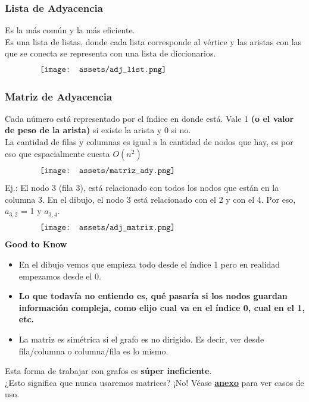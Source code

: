 \documentclass[10pt,a4paper]{article}
\begin{document}
\subsubsection*{Lista de Adyacencia}
Es la más común y la más eficiente. \\
Es una lista de listas, donde cada lista corresponde al vértice y las aristas con las que se conecta se representa con una lista de diccionarios. 
\[\begin{minipage}[b]{0.8\textwidth}
    \texttt{[image: assets/adj\_list.png]}
\end{minipage}\]
\subsubsection*{Matriz de Adyacencia}
Cada número está representado por el índice en donde está. Vale 1 \textbf{(o el valor de peso de la arista)} si existe la arista y 0 si no. \\
La cantidad de filas y columnas es igual a la cantidad de nodos que hay, es por eso que espacialmente cuesta $O(n^{2})$
\[\begin{minipage}[b]{0.8\textwidth}
    \texttt{[image: assets/matriz\_ady.png]}
\end{minipage}\]
Ej.: El nodo 3 (fila 3), está relacionado con todos los nodos que están en la columna 3. En el dibujo, el nodo 3 está relacionado con el 2 y con el 4. Por eso, $a_{3, 2}$ = 1 y $a_{3, 4}$. 
\[\begin{minipage}[b]{0.8\textwidth}
    \texttt{[image: assets/adj\_matrix.png]}
\end{minipage}\]
\textbf{Good to Know}
\begin{itemize}
    \item En el dibujo vemos que empieza todo desde el índice 1 pero en realidad empezamos desde el 0. 
    \item \textbf{Lo que todavía no entiendo es, qué pasaría si los nodos guardan información compleja, como elijo cual va en el índice 0, cual en el 1, etc.} 
    \item La matriz es simétrica si el grafo es no dirigido. Es decir, ver desde fila/columna o columna/fila es lo mismo. 
\end{itemize}
Esta forma de trabajar con grafos es \textbf{súper ineficiente}. \\
¿Esto significa que nunca usaremos matrices? ¡No! Véase \hyperref[subsec:representacion_grafos_practica]{\textbf{anexo}} para ver casos de uso.
\end{document}
